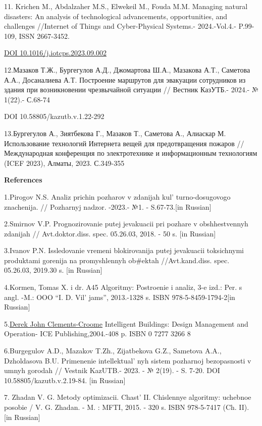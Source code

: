 11. Krichen M., Abdalzaher M.S., Elwekeil M., Fouda M.M. Managing
natural disasters: An analysis of technological advancements,
opportunities, and challenges //Internet of Things and Cyber-Physical
Systems.- 2024.-Vol.4.- P.99-109, ISSN 2667-3452.

\href{https://doi.org/10.1016/j.iotcps.2023.09.002}{DOI
10.1016/j.iotcps.2023.09.002}

12.Мазаков Т.Ж., Бургегулов А.Д., Джомартова Ш.А., Мазакова А.Т.,
Саметова А.А., Досаналиева А.Т. Построение маршрутов для эвакуации
сотрудников из здания при возникновении чрезвычайной ситуации // Вестник
КазУТБ.- 2024.- № 1(22).- С.68-74

DOI 10.58805/kazutb.v.1.22-292

13.Бургегулов А., Зиятбекова Г., Мазаков Т., Саметова А., Алиаскар М.
Использование технологий Интернета вещей для предотвращения пожаров //
Международная конференция по электротехнике и информационным технологиям
(ICEF 2023), Алматы, 2023. С.349-355

{\bfseries References}

1.Pirogov N.S. Analiz prichin pozharov v zdanijah
kul' turno-dosugovogo znachenija. // Pozharnyj nadzor.
-2023.- №1. - S.67-73.{[}in Russian{]}

2.Smirnov V.P. Prognozirovanie putej jevakuacii pri pozhare v
obshhestvennyh zdanijah // Avt.doktor.diss. spec. 05.26.03, 2018. - 50
s. {[}in Russian{]}

3.Ivanov P.N. Issledovanie vremeni blokirovanija putej jevakuacii
toksichnymi produktami gorenija na promyshlennyh ob\#ektah
//Avt.kand.diss. spec. 05.26.03, 2019.30 s. {[}in Russian{]}

4.Kormen, Tomas X. i dr. A45 Algoritmy: Postroenie i analiz, 3-e izd.:
Per. s angl. -M.: OOO ``I. D. Vil' jams'', 2013.-1328 s.
ISBN 978-5-8459-1794-2{[}in Russian{]}

5.\href{https://www.researchgate.net/profile/Derek-Clements-Croome}{Derek
John Clements-Croome} Intelligent Buildings: Design Management and
Operation- ICE Publishing,2004.-408 p. ISBN 0 7277 3266 8

6.Burgegulov A.D., Mazakov T.Zh., Zijatbekova G.Z., Sametova A.A.,
Dzholdasova B.U. Primenenie intellektual' nyh sistem
pozharnoj bezopasnosti v umnyh gorodah // Vestnik KazUTB.- 2023. - №
2(19). - S. 7-20. DOI 10.58805/kazutb.v.2.19-84. {[}in Russian{]}

7. Zhadan V. G. Metody optimizacii. Chast'{} II.
Chislennye algoritmy: uchebnoe posobie / V. G. Zhadan. - M. : MFTI,
2015. - 320 s. ISBN 978-5-7417 (Ch. II). {[}in Russian{]}

